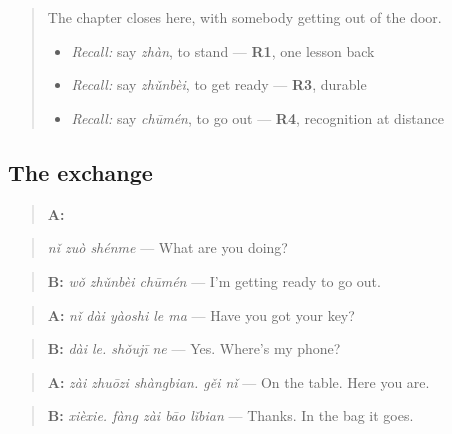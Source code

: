 \section[Practice]{}

\label{lesson:ZH-C89-practice}



\begin{quote}
The chapter closes here, with somebody getting out of the door.

\begin{itemize}
\raggedright
  \item \emph{Recall:} say \emph{zhàn}, to stand — \textbf{R1}, one lesson back
  \item \emph{Recall:} say \emph{zhǔnbèi}, to get ready — \textbf{R3}, durable
  \item \emph{Recall:} say \emph{chūmén}, to go out — \textbf{R4}, recognition at distance
\end{itemize}
\end{quote}

\subsection*{The exchange}
\begin{quote}
\textbf{A:} 
\end{quote}

\begin{quote}
\emph{nǐ zuò shénme} — What are you doing?
\end{quote}

\begin{quote}
\textbf{B:} \emph{wǒ zhǔnbèi chūmén} — I'm getting ready to go out.
\end{quote}

\begin{quote}
\textbf{A:} \emph{nǐ dài yàoshi le ma} — Have you got your key?
\end{quote}

\begin{quote}
\textbf{B:} \emph{dài le. shǒujī ne} — Yes. Where's my phone?
\end{quote}

\begin{quote}
\textbf{A:} \emph{zài zhuōzi shàngbian. gěi nǐ} — On the table. Here you are.
\end{quote}

\begin{quote}
\textbf{B:} \emph{xièxie. fàng zài bāo lǐbian} — Thanks. In the bag it goes.
\end{quote}

